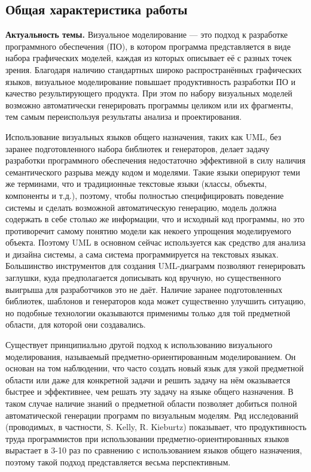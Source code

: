 \subsection*{\Large Общая характеристика работы}
\fontsize{14pt}{15pt}\selectfont
\textbf{Актуальность темы.}
Визуальное моделирование --- это подход к разработке программного обеспечения (ПО), в котором программа представляется 
в виде набора графических моделей, каждая из которых описывает её с разных точек 
зрения. Благодаря наличию стандартных широко распространённых графических языков, 
визуальное моделирование повышает продуктивность разработки ПО и качество результирующего 
продукта. При этом по набору визуальных моделей возможно автоматически генерировать программы 
целиком или их фрагменты, тем самым переиспользуя результаты анализа и проектирования.

Использование визуальных языков общего назначения, таких как UML, без заранее 
подготовленного набора библиотек и генераторов, делает задачу разработки 
программного обеспечения недостаточно эффективной в силу наличия семантического разрыва между 
кодом и моделями. Такие языки оперируют теми же терминами, что и традиционные текстовые языки 
(классы, объекты, компоненты и т.д.), поэтому, чтобы полностью специфицировать 
поведение системы и сделать возможной автоматическую генерацию, модель должна 
содержать в себе столько же информации, что и исходный код программы, но это 
противоречит самому понятию модели как некоего упрощения моделируемого объекта. 
Поэтому UML в основном сейчас используется как средство для анализа и 
дизайна системы, а сама система программируется на текстовых языках. Большинство инструментов 
для создания UML-диаграмм позволяют генерировать заглушки, куда предполагается дописывать код вручную, но 
существенного выигрыша для разработчиков это не даёт. Наличие заранее подготовленных 
библиотек, шаблонов и генераторов кода может существенно улучшить ситуацию, но подобные 
технологии оказываются применимы только для той предметной области, для которой они создавались.

Существует принципиально другой подход к использованию визуального 
моделирования, называемый предметно-ориентированным моделированием. Он основан на том наблюдении, что часто создать новый 
язык для узкой предметной области или даже для конкретной задачи и решить задачу 
на нём оказывается быстрее и эффективнее, чем решать эту задачу на языке общего назначения. 
В таком случае наличие знаний о предметной области позволяет добиться полной автоматической генерации программ по визуальным моделям.
Ряд исследований (проводимых, в частности, S. Kelly, R. Kieburtz) показывает, что продуктивность 
труда программистов при использовании предметно-ориентированных языков вырастает в 3-10 раз по сравнению с 
использованием языков общего назначения, поэтому такой подход представляется 
весьма перспективным.

